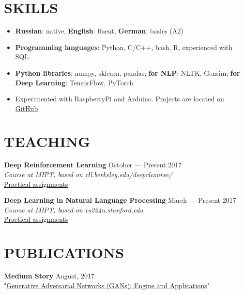 \documentclass[margin, 9pt]{res} %
\begin{document}
\begin{resume}
\section{SKILLS} 

\begin{itemize} 
\item \textbf{Russian}: native, \textbf{English}: fluent, \textbf{German}: basics (A2)
\item \textbf{Programming languages}: Python, C/C++, bash, R, experienced with SQL
\item \textbf{Python libraries}: numpy, sklearn, pandas; \textbf{for NLP}: NLTK, Gensim; \textbf{for Deep Learning}: TensorFlow, PyTorch
\item Experimented with RaspberryPi and Arduino. Projects are located on \href{https://github.com/akarazeevprojects}{GitHub}
\end{itemize}


\section{TEACHING}

\textbf{Deep Reinforcement Learning} \hfill October --- Present 2017\\
{\sl Course at MIPT, based on rll.berkeley.edu/deeprlcourse/}\\
\href{https://github.com/deepmipt/deep-rl-seminars}{Practical assignments}

\textbf{Deep Learning in Natural Language Processing} \hfill March --- Present 2017\\
{\sl Course at MIPT, based on cs224n.stanford.edu}\\
\href{https://github.com/deepmipt/deep-nlp-seminars}{Practical assignments}


\section{PUBLICATIONS}

\textbf{Medium Story} \hfill August, 2017 \\
"\href{https://blog.statsbot.co/generative-adversarial-networks-gans-engine-and-applications-f96291965b47}{Generative Adversarial Networks (GANs): Engine and Applications}"


\end{resume}
\end{document}
